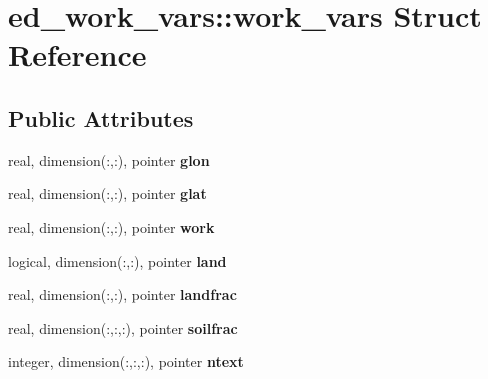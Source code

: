 \hypertarget{structed__work__vars_1_1work__vars}{
\section{ed\_\-work\_\-vars::work\_\-vars Struct Reference}
\label{structed__work__vars_1_1work__vars}
}
\subsection*{Public Attributes}
\begin{DoxyCompactItemize}
\item 
\hypertarget{structed__work__vars_1_1work__vars_a717a6d5af43be85cf9a6fd1bc2eaeaea}{
real, dimension(:,:), pointer {\bfseries glon}}
\label{structed__work__vars_1_1work__vars_a717a6d5af43be85cf9a6fd1bc2eaeaea}

\item 
\hypertarget{structed__work__vars_1_1work__vars_a1339a00981044cfcd1a22798c45b740c}{
real, dimension(:,:), pointer {\bfseries glat}}
\label{structed__work__vars_1_1work__vars_a1339a00981044cfcd1a22798c45b740c}

\item 
\hypertarget{structed__work__vars_1_1work__vars_ad31f591b87fd8ec76a458f06f48d24be}{
real, dimension(:,:), pointer {\bfseries work}}
\label{structed__work__vars_1_1work__vars_ad31f591b87fd8ec76a458f06f48d24be}

\item 
\hypertarget{structed__work__vars_1_1work__vars_a858505d5bcd79d7c568881edb99e4df1}{
logical, dimension(:,:), pointer {\bfseries land}}
\label{structed__work__vars_1_1work__vars_a858505d5bcd79d7c568881edb99e4df1}

\item 
\hypertarget{structed__work__vars_1_1work__vars_a12f5858672b914cae1529c3364906e5b}{
real, dimension(:,:), pointer {\bfseries landfrac}}
\label{structed__work__vars_1_1work__vars_a12f5858672b914cae1529c3364906e5b}

\item 
\hypertarget{structed__work__vars_1_1work__vars_ad4e986caac39543ea2c6742e6d0db348}{
real, dimension(:,:,:), pointer {\bfseries soilfrac}}
\label{structed__work__vars_1_1work__vars_ad4e986caac39543ea2c6742e6d0db348}

\item 
\hypertarget{structed__work__vars_1_1work__vars_a835ad202c5070b02d49807c067529c07}{
integer, dimension(:,:,:), pointer {\bfseries ntext}}
\label{structed__work__vars_1_1work__vars_a835ad202c5070b02d49807c067529c07}


\end{DoxyCompactItemize}
